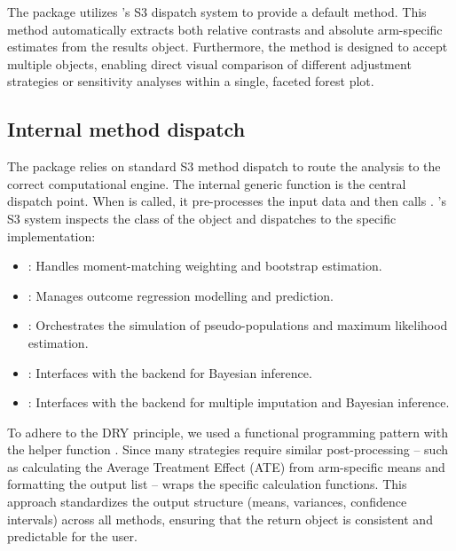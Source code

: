 \documentclass[article]{jss}
\begin{document}
The  package utilizes 's S3 dispatch system to provide a default  method. This method automatically extracts both relative contrasts and absolute arm-specific estimates from the results object. Furthermore, the method is designed to accept multiple  objects, enabling direct visual comparison of different adjustment strategies or sensitivity analyses within a single, faceted forest plot.

\subsection{Internal method dispatch}
The  package relies on standard S3 method dispatch to route the analysis to the correct computational engine. The internal generic function  is the central dispatch point.
When  is called, it pre-processes the input data and then calls . 's S3 system inspects the class of the  object and dispatches to the specific implementation:

\begin{itemize}
  \item {}: Handles moment-matching weighting and bootstrap estimation.
  \item {}: Manages outcome regression modelling and prediction.
  \item {}: Orchestrates the simulation of pseudo-populations and maximum likelihood estimation.
  \item {}: Interfaces with the  backend for Bayesian inference.
  \item {}: Interfaces with the  backend for multiple imputation and Bayesian inference.
\end{itemize}

To adhere to the DRY principle, we used a functional programming pattern with the helper function . Since many strategies require similar post-processing -- such as calculating the Average Treatment Effect (ATE) from arm-specific means and formatting the output list --  wraps the specific calculation functions. This approach standardizes the output structure (means, variances, confidence intervals) across all methods, ensuring that the  return object is consistent and predictable for the user.
\end{document}
